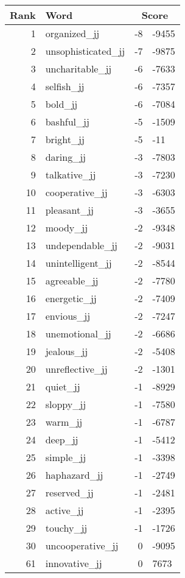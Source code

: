 \begin{longtable}[!htbp]{| rlr@{.}l |}
    \hline
    \textbf{Rank} & \textbf{Word} & \multicolumn{2}{c|}{\textbf{Score}} \\
    \hline
    \endhead
    1 & organized\_jj & -8 & -9455 \\
    2 & unsophisticated\_jj & -7 & -9875 \\
    3 & uncharitable\_jj & -6 & -7633 \\
    4 & selfish\_jj & -6 & -7357 \\
    5 & bold\_jj & -6 & -7084 \\
    6 & bashful\_jj & -5 & -1509 \\
    7 & bright\_jj & -5 & -11 \\
    8 & daring\_jj & -3 & -7803 \\
    9 & talkative\_jj & -3 & -7230 \\
    10 & cooperative\_jj & -3 & -6303 \\
    11 & pleasant\_jj & -3 & -3655 \\
    12 & moody\_jj & -2 & -9348 \\
    13 & undependable\_jj & -2 & -9031 \\
    14 & unintelligent\_jj & -2 & -8544 \\
    15 & agreeable\_jj & -2 & -7780 \\
    16 & energetic\_jj & -2 & -7409 \\
    17 & envious\_jj & -2 & -7247 \\
    18 & unemotional\_jj & -2 & -6686 \\
    19 & jealous\_jj & -2 & -5408 \\
    20 & unreflective\_jj & -2 & -1301 \\
    21 & quiet\_jj & -1 & -8929 \\
    22 & sloppy\_jj & -1 & -7580 \\
    23 & warm\_jj & -1 & -6787 \\
    24 & deep\_jj & -1 & -5412 \\
    25 & simple\_jj & -1 & -3398 \\
    26 & haphazard\_jj & -1 & -2749 \\
    27 & reserved\_jj & -1 & -2481 \\
    28 & active\_jj & -1 & -2395 \\
    29 & touchy\_jj & -1 & -1726 \\
    30 & uncooperative\_jj & 0 & -9095 \\
    61 & innovative\_jj & 0 & 7673 \\

\end{longtable}
